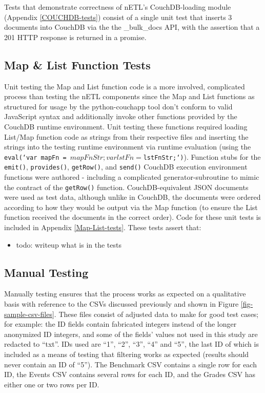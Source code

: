 Tests that demonstrate correctness of nETL's CouchDB-loading module (Appendix \ref{COUCHDB-tests}) consist of a single unit test that inserts 3 documents into CouchDB via the the \_bulk\_docs API, with the assertion that a 201 HTTP response is returned in a promise.

\subsection{Map \& List Function Tests}
Unit testing the Map and List function code is a more involved, complicated process than testing the nETL components since the Map and List functions as structured for usage by the python-couchapp tool don't conform to valid JavaScript syntax and additionally invoke other functions provided by the CouchDB runtime environment. Unit testing these functions required loading List/Map function code as strings from their respective files and inserting the strings into the testing runtime environment via runtime evaluation (using the \texttt{eval(`var mapFn = ${mapFnStr}; var lstFn = ${lstFnStr};`)}). Function stubs for the \texttt{emit()}, \texttt{provides()}, \texttt{getRow()}, and \texttt{send()} CouchDB execution environment functions were authored - including a complicated generator-subroutine to mimic the contract of the \texttt{getRow()} function. CouchDB-equivalent JSON documents were used as test data, although unlike in CouchDB, the documents were ordered according to how they would be output via the Map function (to ensure the List function received the documents in the correct order). Code for these unit tests is included in Appendix \ref{Map-List-tests}. These tests assert that:

\begin{itemize}
    \item todo: writeup what is in the tests
\end{itemize}


\subsection{Manual Testing}
Manually testing ensures that the process works as expected on a qualitative basis with reference to the CSVs discussed previously and shown in Figure \ref{fig-sample-csv-files}. These files consist of adjusted data to make for good test cases; for example: the ID fields contain fabricated integers instead of the longer anonymized ID integers, and some of the fields' values not used in this study are redacted to ``txt''. IDs used are ``1'', ``2'', ``3'', ``4'' and ``5'', the last ID of which is included as a means of testing that filtering works as expected (results should never contain an ID of ``5''). The Benchmark CSV contains a single row for each ID, the Events CSV contains several rows for each ID, and the Grades CSV has either one or two rows per ID.

